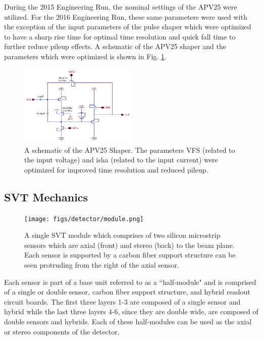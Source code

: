 During the 2015 Engineering Run, the nominal settings of the APV25 were utilized. For the 2016 Engineering Run, these same parameters were used with the exception of the input parameters of the pulse shaper which were optimized to have a sharp rise time for optimal time resolution and quick fall time to further reduce pileup effects. A schematic of the APV25 shaper and the parameters which were optimized is shown in Fig. \ref{fig:apv25shaper}.



\begin{figure}
    \centering
    \includegraphics[width=0.5\textwidth]{figs/detector/apv25shaper.png}
    \caption{A schematic of the APV25 Shaper. The parameters VFS (related to the input voltage) and isha (related to the input current) were optimized for improved time resolution and reduced pileup.}
    \label{fig:apv25shaper}
\end{figure}

\clearpage

\subsection{SVT Mechanics}\label{sec:svt_mechanical}

\begin{figure}
    \centering
    \texttt{[image: figs/detector/module.png]}
    \caption{A single SVT module which comprises of two silicon microstrip sensors which are axial (front) and stereo (back) to the beam plane. Each sensor is supported by a carbon fiber support structure can be seen protruding from the right of the axial sensor.}
    \label{fig:svtmodule}
\end{figure}

Each sensor is part of a base unit referred to as a ``half-module" and is comprised of a single or double sensor, carbon fiber support structure, and hybrid readout circuit boards. The first three layers 1-3 are composed of a single sensor and hybrid while the last three layers 4-6, since they are double wide, are composed of double sensors and hybrids. Each of these half-modules can be used as the axial or stereo components of the detector.

